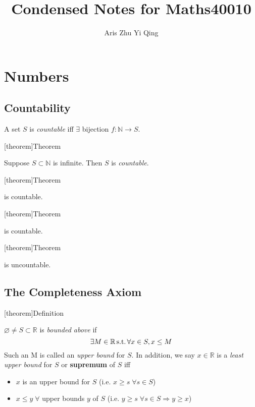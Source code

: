 \documentclass[12pt]{report}
\author{Aris Zhu Yi Qing}
\title{Condensed Notes for Maths40010}
\theoremstyle{definition}
\begin{document}
\maketitle
\tableofcontents

\chapter{Numbers}

\section{Countability}
\begin{theorem}
    A set $S$ is \emph{countable} iff $\exists$ bijection $f: \mathbb{N} \rightarrow S$.
\end{theorem}

[theorem]{Theorem}
\begin{subset of countable set}
    Suppose $S \subset \mathbb{N}$ is infinite. Then $S$ is \emph{countable}.
\end{subset of countable set}

[theorem]{Theorem}
\begin{Z is countable}
     is countable.
\end{Z is countable}

[theorem]{Theorem}
\begin{Q is countable}
     is countable.
\end{Q is countable}

[theorem]{Theorem}
\begin{R is uncountable}
     is uncountable.
\end{R is uncountable}

\section{The Completeness Axiom}
[theorem]{Definition}
\begin{upper bound and sup}
    $\varnothing \neq S \subset \mathbb{R}$ is \emph{bounded above} if \[
        \exists M \in \mathbb{R} \,\textnormal{s.t.} \, \forall x \in S, x \le M
    \]
    Such an M is called an \emph{upper bound} for $S$. 
    In addition, we say $x \in \mathbb{R}$ is a \emph{least upper bound} for $S$ or \textbf{supremum} of $S$ iff
    \begin{itemize}
        \item $x$ is an upper bound for $S$ (i.e. $x \ge s \;\forall s \in S$)
        \item $x \le y \;\forall$ upper bounds $y$ of $S$ (i.e. $y \ge s \;\forall s \in S \Rightarrow y \ge x$)
    \end{itemize}
\end{upper bound and sup}
\end{document}
